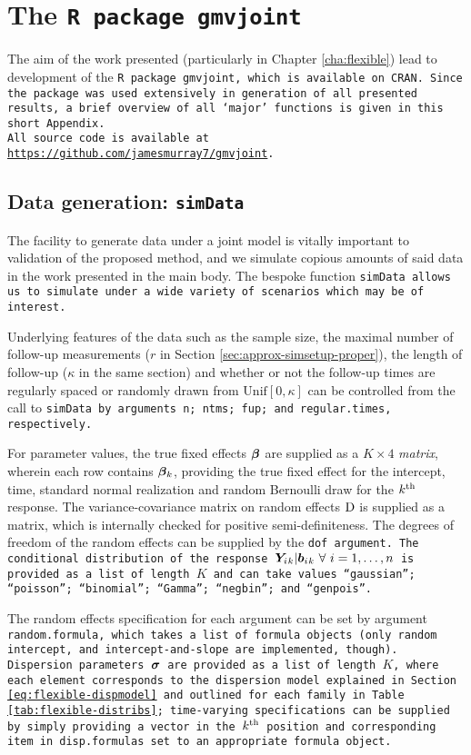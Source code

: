 \chapter{The \tt{R} package \tt{gmvjoint}}\label{cha:appendix-gmvjoint}
The aim of the work presented (particularly in Chapter \ref{cha:flexible}) lead to development of the \tt{R} package \tt{gmvjoint}, which is available on CRAN. Since the package was used extensively in generation of all presented results, a brief overview of all `major' functions is given in this short Appendix.\\All source code is available at \url{https://github.com/jamesmurray7/gmvjoint}.

\section{Data generation: \tt{simData}}\label{sec:appendix-gmvjoint-simData}
The facility to generate data under a joint model is vitally important to validation of the proposed method, and we simulate copious amounts of said data in the work presented in the main body. The bespoke function \tt{simData} allows us to simulate under a wide variety of scenarios which may be of interest. 

Underlying features of the data such as the sample size, the maximal number of follow-up measurements (\ie $r$ in Section \ref{sec:approx-simsetup-proper}), the length of follow-up ($\kappa$ in the same section) and whether or not the follow-up times are regularly spaced or randomly drawn from $\mathrm{Unif}[0,\kappa]$ can be controlled from the call to \tt{simData} by arguments \tt{n}; \tt{ntms}; \tt{fup}; and \tt{regular.times}, respectively.

For parameter values, the true fixed effects $\bm{\beta}$ are supplied as a $K\times4$ \textit{matrix}, wherein each row contains $\bm{\beta}_k$, providing the true fixed effect for the intercept, time, standard normal realization and random Bernoulli draw for the $k^{\text{th}}$ response. The variance-covariance matrix on random effects $\mathrm{D}$ is supplied as a matrix, which is internally checked for positive semi-definiteness. The degrees of freedom of the random effects can be supplied by the \tt{dof} argument. The conditional distribution of the response $\Y{_k}|\b{_k}\ \forall\ i=1,\dots,n$ is provided as a \tt{list} of length $K$ and can take values ``\tt{gaussian}''; ``\tt{poisson}''; ``\tt{binomial}''; ``\tt{Gamma}''; ``\tt{negbin}''; and ``\tt{genpois}''.

The random effects specification for each argument can be set by argument \tt{random.formula}, which takes a \tt{list} of \tt{formula} objects (only random intercept, and intercept-and-slope are implemented, though). Dispersion parameters $\bm{\sigma}$ are provided as a \tt{list} of length $K$, where each element corresponds to the dispersion model explained in Section \ref{eq:flexible-dispmodel} and outlined for each family in Table \ref{tab:flexible-distribs}; time-varying specifications can be supplied by simply providing a vector in the $k^{\text{th}}$ position and corresponding item in \tt{disp.formulas} set to an appropriate \tt{formula} object. 

